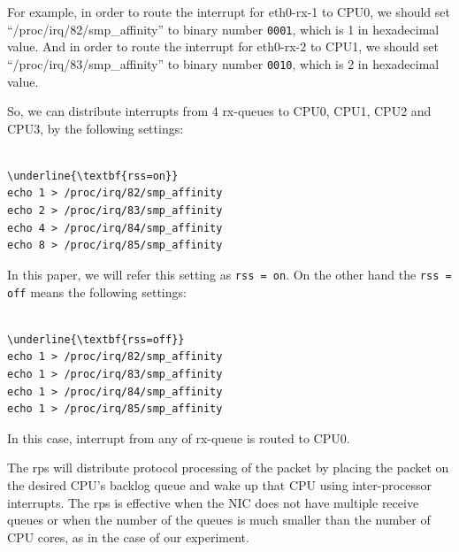 For example, in order to route the interrupt for eth0-rx-1 to CPU0, 
we should set \enquote{/proc/irq/82/smp\_affinity} 
to binary number {\tt 0001}, which is 1 in hexadecimal value.
And in order to route the interrupt for eth0-rx-2 to CPU1, we 
should set \enquote{/proc/irq/83/smp\_affinity} 
to binary number {\tt 0010}, which is 2 in hexadecimal value.

So, we can distribute interrupts from 4 rx-queues to CPU0, CPU1, CPU2 and CPU3, by the following settings: 

\begin{center}
\begin{minipage}{0.8\columnwidth}
\begin{Verbatim}[commandchars=\\\{\}]

\underline{\textbf{rss=on}}
echo 1 > /proc/irq/82/smp_affinity
echo 2 > /proc/irq/83/smp_affinity
echo 4 > /proc/irq/84/smp_affinity
echo 8 > /proc/irq/85/smp_affinity

\end{Verbatim}
\end{minipage}
\end{center}

In this paper, we will refer this setting as {\tt rss = on}.
On the other hand the {\tt rss = off} means the following settings:

\begin{center}
\begin{minipage}{0.8\columnwidth}
\begin{Verbatim}[commandchars=\\\{\}]

\underline{\textbf{rss=off}}
echo 1 > /proc/irq/82/smp_affinity
echo 1 > /proc/irq/83/smp_affinity
echo 1 > /proc/irq/84/smp_affinity
echo 1 > /proc/irq/85/smp_affinity

\end{Verbatim}
\end{minipage}
\end{center}

In this case, interrupt from any of rx-queue is routed to CPU0.

The rps will distribute protocol processing of the packet by placing the packet
on the desired CPU's backlog queue and wake up that CPU using inter-processor interrupts.
The rps is effective when the NIC does not have multiple receive queues or when the number of the queues is 
much smaller than the number of CPU cores, as in the case of our experiment.

